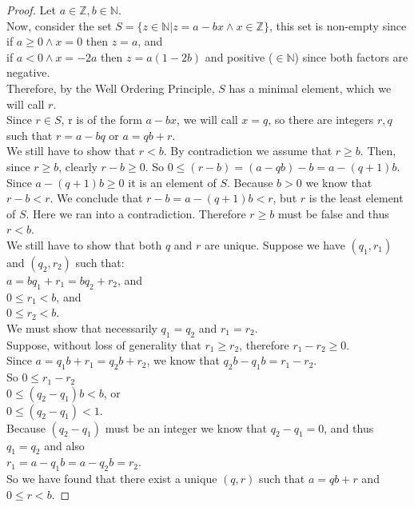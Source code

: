 \begin{proof}
Let $a \in \mathbb{Z}, b \in \mathbb{N}.$ \\
Now, consider the set $S=\{z \in \mathbb{N} | z= a - bx \land x \in \mathbb{Z} \}$, this set is non-empty since\\
\hspace*{0.5 cm}if $a \geq 0 \land x=0$ then $z=a$, and\\
\hspace*{0.5 cm}if $a < 0 \land x=-2a$ then $z=a(1-2b)$ and positive ($\in \mathbb{N}$) since both factors are negative.\\
Therefore, by the Well Ordering Principle, $S$ has a minimal element, which we will call $r$.\\
Since $r \in S$, r is of the form $a-bx$, we will call $x=q$, so there are integers $r,q$ such that $r=a-bq$ or $a=qb+r$.\\
\newline
We still have to show that $r < b$. By contradiction we assume that $r \geq b$. Then, since $r \geq b$, clearly $r-b \geq 0$.
So $0 \leq (r-b) = (a-qb)-b=a-(q+1)b$. Since $a-(q+1)b \geq 0$ it is an element of $S$. Because $b>0$ we know that $r-b<r$.
We conclude that $r-b=a-(q+1)b < r$, but $r$ is the least element of $S$. Here we ran into a contradiction. Therefore
$r \geq b$ must be false and thus $r < b$.\\
\newline
We still have to show that both $q$ and $r$ are unique. Suppose we have $(q_1,r_1)$ and $(q_2,r_2)$ such that:\\
\hspace*{0.5 cm}$a = bq_1+r_1 = bq_2+r_2$, and\\
\hspace*{0.5 cm}$0 \le r_1 < b$, and\\
\hspace*{0.5 cm}$0 \le r_2 < b$.\\
We must show that necessarily $q_1=q_2$ and $r_1=r_2$.\\
Suppose, without loss of generality that $r_1 \geq r_2$, therefore $r_1-r_2 \geq 0$.\\
Since $a=q_1b+r_1=q_2b+r_2$, we know that $q_2b-q_1b=r_1-r_2$.\\
So
\hspace*{0.5 cm}$0 \leq r_1 -r_2$ \\
\hspace*{0.5 cm}$0 \leq (q_2 -q_1)b < b$, or \\
\hspace*{0.5 cm}$0 \leq (q_2 -q_1) < 1$.\\
Because $(q_2-q_1)$ must be an integer we know that $q_2-q_1=0$, and thus $q_1=q_2$ and also\\
$r_1=a-q_1 b= a - q_2 b = r_2$.\\
\newline
So we have found that there exist a unique $(q,r)$ such that $a=q b + r$ and $0 \leq r < b$. 
\end{proof}
